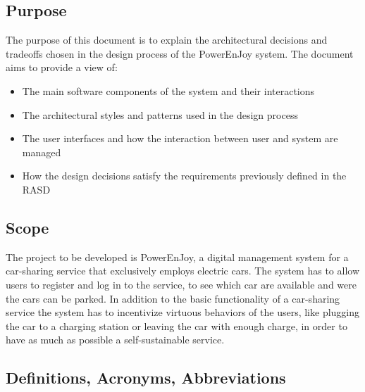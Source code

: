 \subsection{Purpose}
The purpose of this document is to explain the architectural decisions and tradeoffs chosen in the design process of the PowerEnJoy system.
The document aims to provide a view of:
\begin{itemize}
\item The main software components of the system and their interactions
\item The architectural styles and patterns used in the design process
\item The user interfaces and how the interaction between user and system are managed
\item How the design decisions satisfy the requirements previously defined in the RASD
\end{itemize}

\subsection{Scope}
The project to be developed is PowerEnJoy, a digital management system for a car-sharing service that exclusively employs electric cars.
The system has to allow users to register and log in to the service, to see which car are available and were the cars can be parked. In addition to the basic functionality of a car-sharing service the system has to incentivize virtuous behaviors of the users, like plugging the car to a charging station or leaving the car with enough charge, in order to have as much as possible a self-sustainable service.

\subsection{Definitions, Acronyms, Abbreviations}
